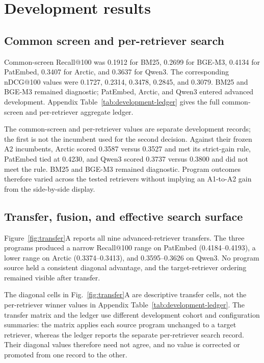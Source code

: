 \documentclass[final,5p,times,twocolumn]{elsarticle}
\begin{document}
\section{Development results}\label{sec:development}

\subsection{Common screen and per-retriever search}

Common-screen Recall@100 was 0.1912 for BM25, 0.2699 for BGE-M3, 0.4134 for
PatEmbed, 0.3407 for Arctic, and 0.3637 for Qwen3. The corresponding nDCG@100
values were 0.1727, 0.2314, 0.3478, 0.2845, and 0.3079. BM25 and BGE-M3
remained diagnostic; PatEmbed, Arctic, and Qwen3 entered advanced development.
Appendix Table~\ref{tab:development-ledger} gives the full common-screen and
per-retriever aggregate ledger.

The common-screen and per-retriever values are separate development records;
the first is not the incumbent used for the second decision. Against their
frozen A2 incumbents, Arctic scored 0.3587 versus 0.3527 and met its strict-gain
rule, PatEmbed tied at 0.4230, and Qwen3 scored 0.3737 versus 0.3800 and did not
meet the rule. BM25 and BGE-M3 remained diagnostic. Program outcomes therefore
varied across the tested retrievers without implying an A1-to-A2 gain from the
side-by-side display.

\subsection{Transfer, fusion, and effective search surface}

Figure~\ref{fig:transfer}A reports all nine advanced-retriever transfers. The
three programs produced a narrow Recall@100 range on PatEmbed
(0.4184--0.4193), a lower range on Arctic (0.3374--0.3413), and
0.3595--0.3626 on Qwen3. No
program source held a consistent diagonal advantage, and the target-retriever
ordering remained visible after transfer.

The diagonal cells in Fig.~\ref{fig:transfer}A are descriptive transfer cells,
not the per-retriever winner values in Appendix Table~\ref{tab:development-ledger}.
The transfer matrix and the ledger use different development cohort and
configuration summaries: the matrix applies each source program unchanged to a
target retriever, whereas the ledger reports the separate per-retriever search
record. Their diagonal values therefore need not agree, and no value is
corrected or promoted from one record to the other.
\end{document}
